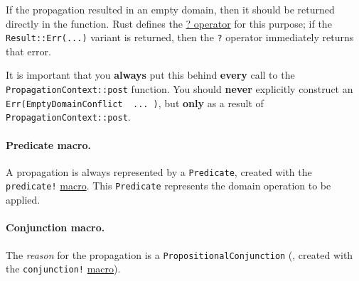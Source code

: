 \documentclass{article}
\begin{document}
        If the propagation resulted in an empty domain, then it should be returned directly in the function. Rust defines the \href{https://doc.rust-lang.org/book/ch09-02-recoverable-errors-with-result.html#the--operator-shortcut}{? operator} for this purpose; if the \texttt{Result::Err(...)} variant is returned, then the \texttt{?} operator immediately returns that error.
        
        It is important that you \textbf{always} put this behind \textbf{every} call to the \texttt{PropagationContext::post} function.
        You should \textbf{never} explicitly construct an \texttt{Err(EmptyDomainConflict { ... })}, but \textbf{only} as a result of \texttt{PropagationContext::post}.
    
    \paragraph{Predicate macro.}
        A propagation is always represented by a \texttt{Predicate}, created with the \texttt{predicate!} \href{https://doc.rust-lang.org/book/ch20-05-macros.html#macros}{macro}.
        This \texttt{Predicate} represents the domain operation to be applied.
    
    \paragraph{Conjunction macro.}
        The \emph{reason} for the propagation is a \texttt{PropositionalConjunction} (, created with the \texttt{conjunction!} \href{https://doc.rust-lang.org/book/ch20-05-macros.html#macros}{macro}).
\end{document}
